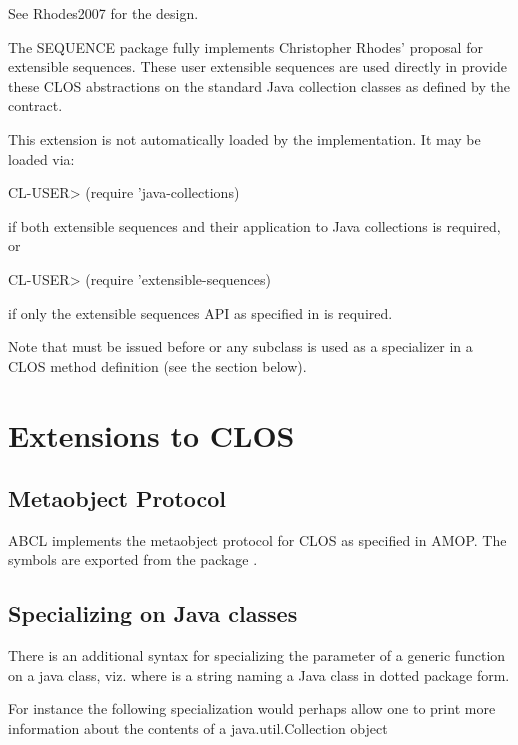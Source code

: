 \documentclass[10pt]{book}
\begin{document}
See Rhodes2007 \cite{RHODES2007} for the design.

The SEQUENCE package fully implements Christopher Rhodes' proposal for
extensible sequences.  These user extensible sequences are used
directly in  provide these CLOS
abstractions on the standard Java collection classes as defined by the
 contract.

This extension is not automatically loaded by the implementation.   It
may be loaded via:

\begin{listing-lisp}
CL-USER> (require 'java-collections)
\end{listing-lisp}

if both extensible sequences and their application to Java collections
is required, or

\begin{listing-lisp}
CL-USER> (require 'extensible-sequences)
\end{listing-lisp}

if only the extensible sequences API as specified in \cite{RHODES2007} is
required.

Note that  must be issued before
 or any subclass is used as a specializer in a CLOS
method definition (see the section below).

\section{Extensions to CLOS}

\subsection{Metaobject Protocol}

ABCL implements the metaobject protocol for CLOS as specified in AMOP.
The symbols are exported from the package .

\subsection{Specializing on Java classes}

There is an additional syntax for specializing the parameter of a
generic function on a java class, viz. 
where  is a string naming a Java class in dotted package
form.

For instance the following specialization would perhaps allow one to
print more information about the contents of a java.util.Collection
object
\end{document}
